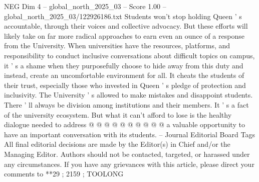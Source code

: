 \begin{textsample}{NEG Dim 4 – global\_north\_2025\_03 – Score 1.00 – global\_north\_2025\_03/122926186.txt}
Students won't stop holding Queen ' s accountable, through their voices and collective advocacy.
But these efforts will likely take on far more radical approaches to earn even an ounce of a response from the University.
When universities have the resources, platforms, and responsibility to conduct inclusive conversations about difficult topics on campus, it ' s a shame when they purposefully choose to hide away from this duty and instead, create an uncomfortable environment for all.
It cheats the students of their trust, especially those who invested in Queen ' s pledge of protection and inclusivity.
The University ' s allowed to make mistakes and disappoint students.
There ' ll always be division among institutions and their members.
It ' s a fact of the university ecosystem.
But what it can't afford to lose is the healthy dialogue needed to address @ @ @ @ @ @ @ @ @ @ a valuable opportunity to have an important conversation with its students. -- Journal Editorial Board Tags All final editorial decisions are made by the Editor(s) in Chief and/or the Managing Editor.
Authors should not be contacted, targeted, or harassed under any circumstances.
If you have any grievances with this article, please direct your comments to **29 ; 2159 ; TOOLONG

\end{textsample}
